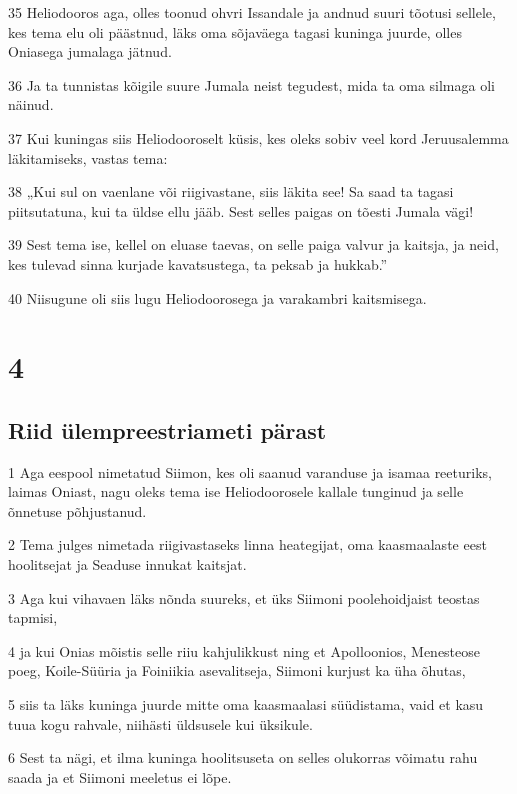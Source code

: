 \par 35 Heliodooros aga, olles toonud ohvri Issandale ja andnud suuri tõotusi sellele, kes tema elu oli päästnud, läks oma sõjaväega tagasi kuninga juurde, olles Oniasega jumalaga jätnud.
\par 36 Ja ta tunnistas kõigile suure Jumala neist tegudest, mida ta oma silmaga oli näinud.
\par 37 Kui kuningas siis Heliodooroselt küsis, kes oleks sobiv veel kord Jeruusalemma läkitamiseks, vastas tema:
\par 38 „Kui sul on vaenlane või riigivastane, siis läkita see! Sa saad ta tagasi piitsutatuna, kui ta üldse ellu jääb. Sest selles paigas on tõesti Jumala vägi!
\par 39 Sest tema ise, kellel on eluase taevas, on selle paiga valvur ja kaitsja, ja neid, kes tulevad sinna kurjade kavatsustega, ta peksab ja hukkab.”
\par 40 Niisugune oli siis lugu Heliodoorosega ja varakambri kaitsmisega.



\chapter{4}


\section*{Riid ülempreestriameti pärast}

\par 1 Aga eespool nimetatud Siimon, kes oli saanud varanduse ja isamaa reeturiks, laimas Oniast, nagu oleks tema ise Heliodoorosele kallale tunginud ja selle õnnetuse põhjustanud.
\par 2 Tema julges nimetada riigivastaseks linna heategijat, oma kaasmaalaste eest hoolitsejat ja Seaduse innukat kaitsjat.
\par 3 Aga kui vihavaen läks nõnda suureks, et üks Siimoni poolehoidjaist teostas tapmisi,
\par 4 ja kui Onias mõistis selle riiu kahjulikkust ning et Apolloonios, Menesteose poeg, Koile-Süüria ja Foiniikia asevalitseja, Siimoni kurjust ka üha õhutas,
\par 5 siis ta läks kuninga juurde mitte oma kaasmaalasi süüdistama, vaid et kasu tuua kogu rahvale, niihästi üldsusele kui üksikule.
\par 6 Sest ta nägi, et ilma kuninga hoolitsuseta on selles olukorras võimatu rahu saada ja et Siimoni meeletus ei lõpe.


